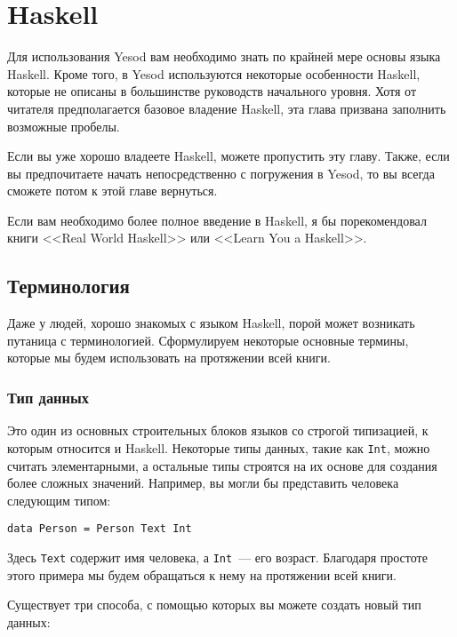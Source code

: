 \chapter{Haskell}

Для использования Yesod вам необходимо знать по крайней мере основы языка Haskell. Кроме того, в Yesod используются некоторые особенности Haskell, которые не описаны в большинстве руководств начального уровня. Хотя от читателя предполагается базовое владение Haskell, эта глава призвана заполнить возможные пробелы.

Если вы уже хорошо владеете Haskell, можете пропустить эту главу. Также, если вы предпочитаете начать непосредственно с погружения в Yesod, то вы всегда сможете потом к этой главе вернуться.

Если вам необходимо более полное введение в Haskell, я бы порекомендовал книги <<Real World Haskell>> или <<Learn You a Haskell>>.

\section{Терминология}

Даже у людей, хорошо знакомых с языком Haskell, порой может возникать путаница с терминологией. Сформулируем некоторые основные термины, которые мы будем использовать на протяжении всей книги.

\subsection{Тип данных}

Это один из основных строительных блоков языков со строгой типизацией, к которым относится и Haskell. Некоторые типы данных, такие как \lstinline'Int', можно считать элементарными, а остальные типы строятся на их основе для создания более сложных значений. Например, вы могли бы представить человека следующим типом:

\begin{lstlisting}
data Person = Person Text Int
\end{lstlisting}

Здесь \lstinline'Text' содержит имя человека, а \lstinline'Int'~--- его возраст. Благодаря простоте этого примера мы будем обращаться к нему на протяжении всей книги.

Существует три способа, с помощью которых вы можете создать новый тип данных:

